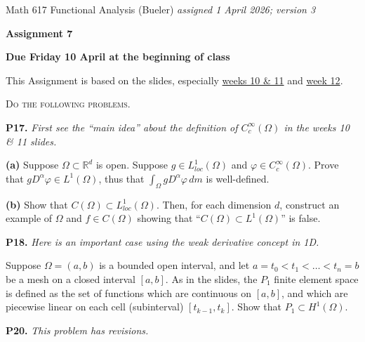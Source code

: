 \documentclass[12pt]{amsart}
\newcommand{\RR}{\mathbb{R}}
\newcommand{\prob}[1]{\bigskip\noindent\textbf{#1.}\quad }
\newcommand{\epart}[1]{\medskip\noindent\textbf{(#1)}\quad }
\begin{document}
\scriptsize \noindent Math 617 Functional Analysis (Bueler) \hfill \emph{assigned 1 April 2026; {\color{red} version 3}}
\normalsize\medskip

\Large\centerline{\textbf{Assignment 7}}
\large
\medskip

\centerline{\textbf{Due Friday 10 April at the beginning of class}}
\medskip
\normalsize

\thispagestyle{empty}

\bigskip
\noindent This Assignment is based on the slides, especially \href{https://bueler.github.io/fa/assets/slides/S26/week10.pdf}{weeks 10 \& 11} and \href{https://bueler.github.io/fa/assets/slides/S26/week12.pdf}{week 12}.

\newcommand{\augment}[1]{\quad\,\strut \begin{minipage}[t]{0.7\textwidth} \emph{#1}\end{minipage}}

\newcommand{\augpart}[1]{\emph{\textbf{(#1)}}}

\medskip
\noindent \textsc{Do the following problems.}


\prob{P17} \emph{First see the ``main idea'' about the definition of $C_c^\infty(\Omega)$ in the weeks 10 \& 11 slides.}

\epart{a} Suppose $\Omega\subset \RR^d$ is open.  Suppose $g\in L_{loc}^1(\Omega)$ and $\varphi \in C_c^\infty(\Omega)$.  Prove that $g D^\alpha\varphi \in L^1(\Omega)$, thus that $\int_\Omega g D^\alpha \varphi\,dm$ is well-defined.

\epart{b}  Show that $C(\Omega)\subset L_{loc}^1(\Omega)$.  Then, for each dimension $d$, construct an example of $\Omega$ and $f\in C(\Omega)$ showing that ``$C(\Omega)\subset L^1(\Omega)$'' is false.

\prob{P18} \emph{Here is an important case using the weak derivative concept in 1D.}

\medskip \noindent Suppose $\Omega=(a,b)$ is a bounded open interval, and let $a=t_0<t_1<\dots<t_n=b$ be a mesh on a closed interval $[a,b]$.  As in the slides, the $P_1$ finite element space is defined as the set of functions which are continuous on $[a,b]$, and which are piecewise linear on each cell (subinterval) $[t_{k-1},t_k]$.  Show that $P_1 \subset H^1(\Omega)$.

\bigskip



\prob{P20}  {\color{red} \emph{This problem has revisions.}}
\end{document}

